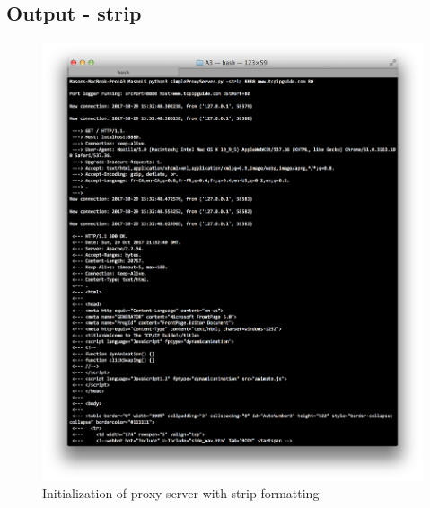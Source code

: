 \documentclass[11pt]{article}
\begin{document}
	\subsection{Output - strip}
	\begin{figure}[H]
	\includegraphics[scale=0.5, trim={0cm 0cm 0cm 0cm}, clip]{strip_output}
	\caption{Initialization of proxy server with strip formatting}
	\end{figure}
\end{document}
